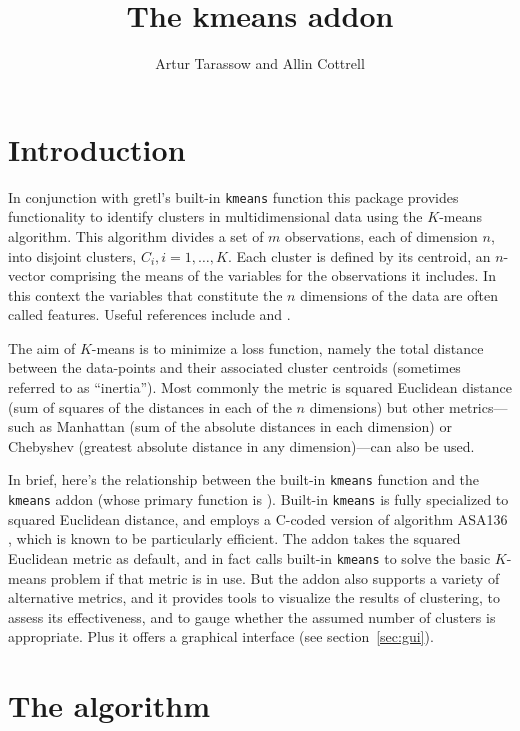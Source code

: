 \documentclass{article}
\title{The \textsf{kmeans} addon}
\author{Artur Tarassow and Allin Cottrell}
\begin{document}
\maketitle

\section{Introduction}

In conjunction with gretl's built-in \texttt{kmeans} function this
package provides functionality to identify clusters in multidimensional
data using the $K$-means algorithm.  This algorithm divides a set of $m$
observations, each of dimension $n$, into disjoint clusters,
$C_i, i=1,\dots,K$. Each cluster is defined by its centroid, an
$n$-vector comprising the means of the variables for the observations it
includes. In this context the variables that constitute the $n$
dimensions of the data are often called features.  Useful references
include \citet{hartigan-wong79} and \citet[ch.\ 12]{ISL2e}.

The aim of $K$-means is to minimize a loss function, namely the total
distance between the data-points and their associated cluster centroids
(sometimes referred to as ``inertia''). Most commonly the metric is
squared Euclidean distance (sum of squares of the distances in each of
the $n$ dimensions) but other metrics---such as Manhattan (sum of the
absolute distances in each dimension) or Chebyshev (greatest absolute
distance in any dimension)---can also be used.

In brief, here's the relationship between the built-in \texttt{kmeans}
function and the \texttt{kmeans} addon (whose primary function is
). Built-in \texttt{kmeans} is fully specialized to
squared Euclidean distance, and employs a C-coded version of algorithm
ASA136 \citep{hartigan-wong79}, which is known to be particularly
efficient. The addon takes the squared Euclidean metric as default, and
in fact  calls built-in \texttt{kmeans} to solve the
basic $K$-means problem if that metric is in use. But the addon also
supports a variety of alternative metrics, and it provides tools to
visualize the results of clustering, to assess its effectiveness, and to
gauge whether the assumed number of clusters is appropriate. Plus it
offers a graphical interface (see section~\ref{sec:gui}).


\section{The algorithm}
\label{sec:algo}
\end{document}
